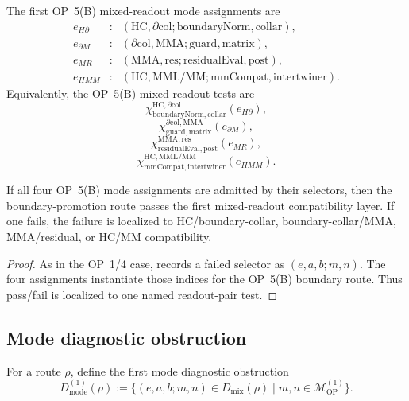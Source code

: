 \begin{definition}
\label{def:v410r20-op5b-mode-assignments}
The first OP~5(B) mixed-readout mode assignments are
\[
\begin{array}{rcl}
e_{H\partial} &:&
(\mathrm{HC},\partial\mathrm{col};
 \mathrm{boundaryNorm},\mathrm{collar}),\\
e_{\partial M} &:&
(\partial\mathrm{col},\mathrm{MMA};
 \mathrm{guard},\mathrm{matrix}),\\
e_{MR} &:&
(\mathrm{MMA},\mathrm{res};
 \mathrm{residualEval},\mathrm{post}),\\
e_{HMM} &:&
(\mathrm{HC},\mathrm{MML/MM};
 \mathrm{mmCompat},\mathrm{intertwiner}).
\end{array}
\]
Equivalently, the OP~5(B) mixed-readout tests are
\[
 \chi^{\mathrm{HC},\partial\mathrm{col}}_{\mathrm{boundaryNorm},\mathrm{collar}}(e_{H\partial}),
\]
\[
 \chi^{\partial\mathrm{col},\mathrm{MMA}}_{\mathrm{guard},\mathrm{matrix}}(e_{\partial M}),
\]
\[
 \chi^{\mathrm{MMA},\mathrm{res}}_{\mathrm{residualEval},\mathrm{post}}(e_{MR}),
\]
\[
 \chi^{\mathrm{HC},\mathrm{MML/MM}}_{\mathrm{mmCompat},\mathrm{intertwiner}}(e_{HMM}).
\]
\end{definition}

\begin{proposition}
\label{prop:v410r20-op5b-first-mode-diagnostic}
If all four OP~5(B) mode assignments are admitted by their selectors, then the
boundary-promotion route passes the first mixed-readout compatibility layer.
If one fails, the failure is localized to HC/boundary-collar,
boundary-collar/MMA, MMA/residual, or HC/MM compatibility.
\end{proposition}

\begin{proof}
As in the OP~1/4 case, records a failed selector as
\((e,a,b;m,n)\). The four assignments instantiate those indices for the
OP~5(B) boundary route. Thus pass/fail is localized to one named readout-pair
test.
\end{proof}

\subsection{Mode diagnostic obstruction}
\label{subsec:v410r20-mode-diagnostic-obstruction}

\begin{definition}
\label{def:v410r20-mode-diagnostic-obstruction}
For a route \(\rho\), define the first mode diagnostic obstruction
\[
 D_{\mathrm{mode}}^{(1)}(\rho)
 :=
 \{(e,a,b;m,n)\in D_{\mathrm{mix}}(\rho)
 \mid m,n\in\mathcal M_{\mathrm{OP}}^{(1)}\}.
\]
\end{definition}

